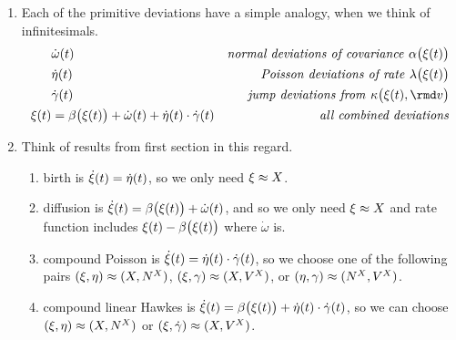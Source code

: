 \begin{enumerate}
\begin{enumerate}
      \item
        Each of the primitive deviations have a simple analogy, when we think of infinitesimals.
        \begin{align*}
          &\dot\omega(t)  & \text{\emph{normal deviations of covariance }} \affDiff\big(\pathVar(t)\big) \\
          &\dot\eta(t) & \text{\emph{Poisson deviations of rate }} \affInt\big(\pathVar(t)\big) \\
          &\dot\gamma(t) & \text{\emph{jump deviations from }} \affDist\big(\pathVar(t), \rmd\markVar\big) \\
          \pathVar(t) &=\affDrift\big(\pathVar(t)\big) + \dot\omega(t) + \dot\eta(t)\cdot\dot\gamma(t) & \text{\emph{all combined deviations}}
        \end{align*}
      \item
        Think of results from first section in this regard.
        \begin{enumerate}
          \item
            birth is  $\dot{\xi}(t) = \dot\eta(t)$, so we only need $\xi \approx X$.
          \item
            diffusion is $\dot{\xi}(t) = \beta\big(\xi(t)\big) + \dot\omega(t)$, and so we only need $\xi\approx X$ and rate function includes $\xi(t) - \beta\big(\xi(t)\big)$ where $\dot\omega$ is.
          \item
            compound Poisson is $\dot{\xi}(t) = \dot\eta(t) \cdot \dot\gamma(t)$, so we choose one of the following pairs $(\xi, \eta) \approx (X, N^X)$, $(\xi, \gamma) \approx (X, V^X)$, or $(\eta, \gamma) \approx (N^X, V^X)$.
          \item
            compound linear Hawkes is $\dot{\xi}(t) = \beta\big(\xi(t)\big) + \dot\eta(t) \cdot \dot\gamma(t)$, so we can choose $(\xi, \eta) \approx (X, N^X)$ or $(\xi, \dot\gamma) \approx (X, V^X)$.
        \end{enumerate}
    \end{enumerate}
\end{enumerate}
